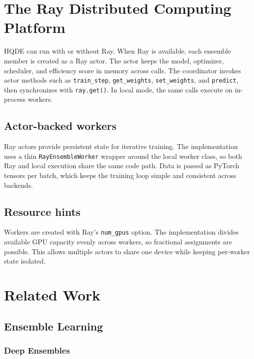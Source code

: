 \documentclass[journal,twoside]{IEEEtran}
\newcommand{\hqde}{\mbox{HQDE}\xspace}
\begin{document}
\section{The Ray Distributed Computing Platform}
\label{sec:ray}

\hqde{} can run with or without Ray. When Ray is available, each
ensemble member is created as a Ray actor. The actor keeps the model,
optimizer, scheduler, and efficiency score in memory across calls. The
coordinator invokes actor methods such as \texttt{train\_step},
\texttt{get\_weights}, \texttt{set\_weights}, and
\texttt{predict}, then synchronizes with \texttt{ray.get()}.
In local mode, the same calls execute on in-process workers.

\subsection{Actor-backed workers}

Ray actors provide persistent state for iterative training. The
implementation uses a thin \texttt{RayEnsembleWorker} wrapper around the
local worker class, so both Ray and local execution share the same code
path. Data is passed as PyTorch tensors per batch, which keeps the
training loop simple and consistent across backends.

\subsection{Resource hints}

Workers are created with Ray's \texttt{num\_gpus} option. The
implementation divides available GPU capacity evenly across workers, so
fractional assignments are possible. This allows multiple actors to
share one device while keeping per-worker state isolated.

\section{Related Work}
\label{sec:related}

\subsection{Ensemble Learning}

\subsubsection{Deep Ensembles}
\end{document}
